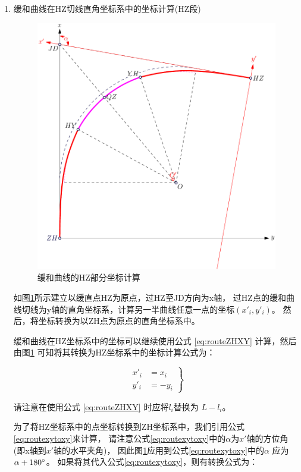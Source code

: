 \begin{enumerate}
\item  缓和曲线在HZ切线直角坐标系中的坐标计算(HZ段)

\begin{figure}[htbp]
    \centering
    \includegraphics[scale=0.8]{route/RHY.pdf}
    \caption{缓和曲线的HZ部分坐标计算}
    \label{fig:RHY}
\end{figure}

如图\ref{fig:RHY}所示建立以缓直点HZ为原点，过HZ至JD方向为x轴，
过HZ点的缓和曲线切线为y轴的直角坐标系，计算另一半曲线任意一点的坐标$(x'_i, y'_i)$。
然后，将坐标转换为以ZH点为原点的直角坐标系中。

缓和曲线在HZ坐标系中的坐标可以继续使用公式 \ref{eq:routeZHXY} 计算，然后由图\ref{fig:RHY}
可知将其转换为HZ坐标系中的坐标计算公式为：

\begin{equation}
\left . \begin{aligned}
x'_i &= x_i  \\
y'_i &= - y_i 
\end{aligned} \right \}
\label{eq:routeHZPtXY}
\end{equation}

请注意在使用公式 \ref{eq:routeZHXY} 时应将$l_i$替换为 $L-l_i$。

为了将HZ坐标系中的点坐标转换到ZH坐标系中，我们引用公式\ref{eq:routexytoxy}来计算，
请注意公式\ref{eq:routexytoxy}中的$\alpha$为$x'$轴的方位角(即x轴到$x'$轴的水平夹角)，
因此图\ref{fig:RHY}应用到公式\ref{eq:routexytoxy}中的$\alpha$ 应为$\alpha + 180 ^\circ $。
如果将其代入公式\ref{eq:routexytoxy}，则有转换公式为：


\end{enumerate}
